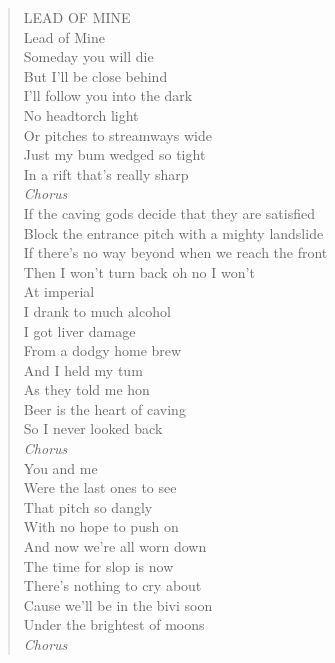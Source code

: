 \begin{verse} \centering \note
LEAD OF MINE \enote\\
 \vspace{0.3cm}
Lead of Mine \\
Someday you will die \\
But I'll be close behind \\
I'll follow you into the dark \\
 \vspace{0.3cm}
No headtorch light \\
Or pitches to streamways wide \\
Just my bum wedged so tight \\
In a rift that's really sharp \\
  \vspace{0.3cm}
\textit{Chorus}\\
 \vspace{0.3cm}
If the caving gods decide that they are satisfied \\
Block the entrance pitch with a mighty landslide \\
If there's no way beyond when we reach the front \\
Then I won't turn back oh no I won't \\
  \vspace{0.3cm}
At imperial \\
I drank to much alcohol \\
I got liver damage \\
From a dodgy home brew \\ 
  \vspace{0.3cm}
And I held my tum \\
As they told me hon \\
Beer is the heart of caving \\
So I never looked back \\ 
  \vspace{0.3cm}
\textit{Chorus} \\ 
 \vspace{0.3cm}
You and me \\
Were the last ones to see \\
That pitch so dangly \\
With no hope to push on \\ 
  \vspace{0.3cm}
And now we're all worn down \\
The time for slop is now \\
There's nothing to cry about \\
Cause we'll be in the bivi soon \\
Under the brightest of moons \\ 
  \vspace{0.3cm}
\textit{Chorus} 

\end{verse}

